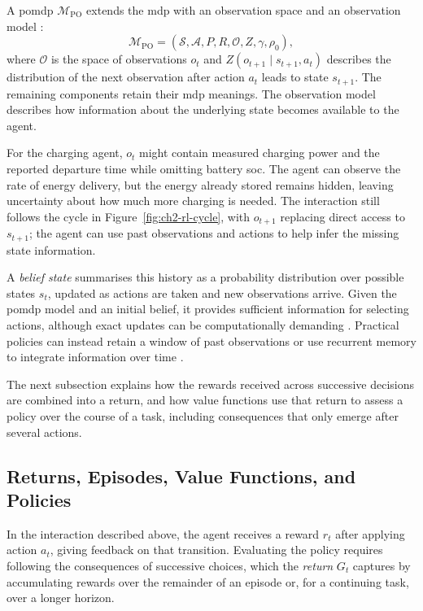 A \gls{pomdp} $\mathcal M_{\mathrm{PO}}$ extends the \gls{mdp} with an observation space and an observation model \parencite{kaelbling1998pomdp}:
\begin{equation}
\mathcal M_{\mathrm{PO}}=(\mathcal S,\mathcal A,P,R,\mathcal O,Z,\gamma,\rho_0),
\label{eq:ch2-pomdp}
\end{equation}
where $\mathcal O$ is the space of observations $o_t$ and $Z(o_{t+1}\mid s_{t+1},a_t)$ describes the distribution of the next observation after action $a_t$ leads to state $s_{t+1}$. The remaining components retain their \gls{mdp} meanings. The observation model describes how information about the underlying state becomes available to the agent.

For the charging agent, $o_t$ might contain measured charging power and the reported departure time while omitting battery \gls{soc}. The agent can observe the rate of energy delivery, but the energy already stored remains hidden, leaving uncertainty about how much more charging is needed. The interaction still follows the cycle in Figure~\ref{fig:ch2-rl-cycle}, with $o_{t+1}$ replacing direct access to $s_{t+1}$; the agent can use past observations and actions to help infer the missing state information.

A \emph{belief state} summarises this history as a probability distribution over possible states $s_t$, updated as actions are taken and new observations arrive. Given the \gls{pomdp} model and an initial belief, it provides sufficient information for selecting actions, although exact updates can be computationally demanding \parencite{kaelbling1998pomdp}. Practical policies can instead retain a window of past observations or use recurrent memory to integrate information over time \parencite{hausknecht2015drqn}.

The next subsection explains how the rewards received across successive decisions are combined into a return, and how value functions use that return to assess a policy over the course of a task, including consequences that only emerge after several actions.

\subsection{Returns, Episodes, Value Functions, and Policies}
\label{sec:ch2-return-value}

In the interaction described above, the agent receives a reward $r_t$ after applying action $a_t$, giving feedback on that transition. Evaluating the policy requires following the consequences of successive choices, which the \emph{return} $G_t$ captures by accumulating rewards over the remainder of an episode or, for a continuing task, over a longer horizon.

